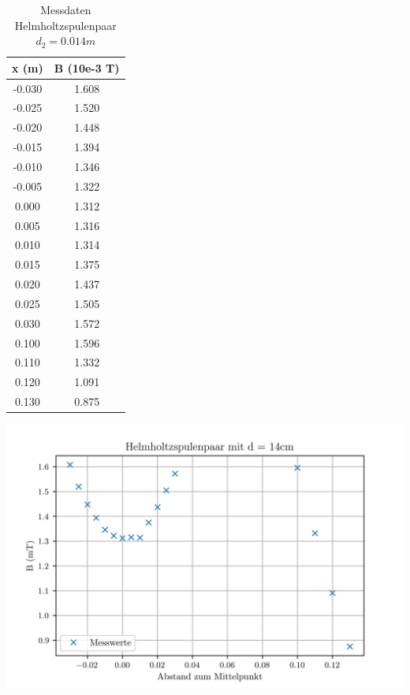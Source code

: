 \begin{table}
\centering
\caption{Messdaten Helmholtzspulenpaar $d_{2} = 0.014m$}
\begin{tabular}{c c}
  \toprule
   x (m) &  B (10e-3 T) \\
  \midrule
  -0.030 &        1.608 \\
  -0.025 &        1.520 \\
  -0.020 &        1.448 \\
  -0.015 &        1.394 \\
  -0.010 &        1.346 \\
  -0.005 &        1.322 \\
   0.000 &        1.312 \\
   0.005 &        1.316 \\
   0.010 &        1.314 \\
   0.015 &        1.375 \\
   0.020 &        1.437 \\
   0.025 &        1.505 \\
   0.030 &        1.572 \\
   0.100 &        1.596 \\
   0.110 &        1.332 \\
   0.120 &        1.091 \\
   0.130 &        0.875 \\
  \bottomrule
  \end{tabular}
\end{table}

\includegraphics[width=\textwidth]{pictures/Helmholtz2.png}    %


